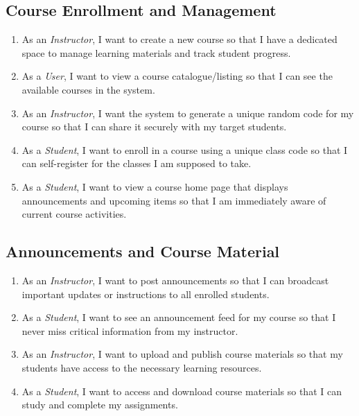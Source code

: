 \documentclass[12pt, a4paper]{article}
\begin{document}
\subsection{Course Enrollment and Management}
\begin{enumerate}[label=\textbf{US\,\arabic*}, start=5]
  \item As an \emph{Instructor}, I want to create a new course so that I have
        a dedicated space to manage learning materials and track student
        progress.
  \item As a \emph{User}, I want to view a course catalogue/listing so that I
        can see the available courses in the system.
  \item As an \emph{Instructor}, I want the system to generate a unique random
        code for my course so that I can share it securely with my target
        students.
  \item As a \emph{Student}, I want to enroll in a course using a unique class
        code so that I can self-register for the classes I am supposed to take.
  \item As a \emph{Student}, I want to view a course home page that displays
        announcements and upcoming items so that I am immediately aware of
        current course activities.
\end{enumerate}

\subsection{Announcements and Course Material}
\begin{enumerate}[label=\textbf{US\,\arabic*}, start=10]
  \item As an \emph{Instructor}, I want to post announcements so that I can
        broadcast important updates or instructions to all enrolled students.
  \item As a \emph{Student}, I want to see an announcement feed for my course
        so that I never miss critical information from my instructor.
  \item As an \emph{Instructor}, I want to upload and publish course materials
        so that my students have access to the necessary learning resources.
  \item As a \emph{Student}, I want to access and download course materials so
        that I can study and complete my assignments.
\end{enumerate}
\end{document}
